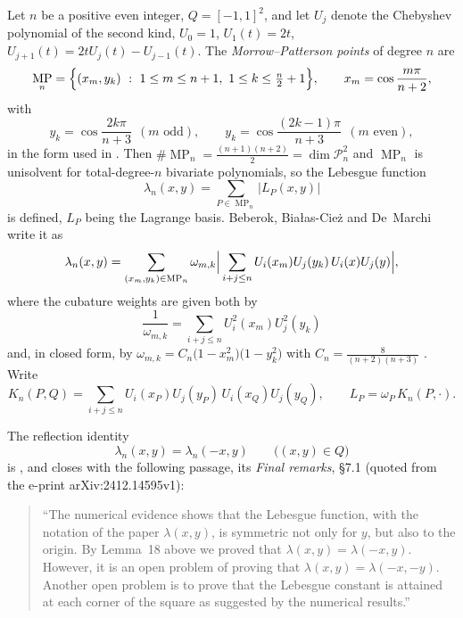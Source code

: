 \documentclass[11pt]{amsart}
\DeclareMathOperator{\MP}{MP}
\newcommand{\Q}{Q}
\begin{document}
Let $n$ be a positive even integer, $\Q=[-1,1]^2$, and let $U_j$ denote the
Chebyshev polynomial of the second kind, $U_0=1$, $U_1(t)=2t$,
$U_{j+1}(t)=2tU_j(t)-U_{j-1}(t)$. The \emph{Morrow--Patterson points}
\cite{MP} of degree $n$ are
\begin{equation}\label{eq:nodes}
  \MP_n=\Bigl\{(x_m,y_k)\ :\ 1\le m\le n+1,\ 1\le k\le \tfrac n2+1\Bigr\},
  \qquad
  x_m=\cos\frac{m\pi}{n+2},
\end{equation}
with
\[
  y_k=\cos\frac{2k\pi}{n+3}\ \ (m\text{ odd}),
  \qquad
  y_k=\cos\frac{(2k-1)\pi}{n+3}\ \ (m\text{ even}),
\]
in the form used in \cite[\S3.2]{BBD}. Then
$\#\MP_n=\frac{(n+1)(n+2)}2=\dim\mathcal P_n^2$ and $\MP_n$ is unisolvent
for total-degree-$n$ bivariate polynomials, so the Lebesgue function
\[
  \lambda_n(x,y)=\sum_{P\in\MP_n}\bigl|L_P(x,y)\bigr|
\]
is defined, $L_P$ being the Lagrange basis. Beberok, Bia\l as-Cie\.z and
De~Marchi \cite{BBD} write it as
\begin{equation}\label{eq:leb}
  \lambda_n(x,y)=\sum_{(x_m,y_k)\in\MP_n}\omega_{m,k}
  \Bigl|\,\sum_{i+j\le n}U_i(x_m)U_j(y_k)\,U_i(x)U_j(y)\Bigr|,
\end{equation}
where the cubature weights are given both by
\begin{equation}\label{eq:wdef}
  \frac1{\omega_{m,k}}=\sum_{i+j\le n}U_i^2(x_m)U_j^2(y_k)
\end{equation}
and, in closed form, by
$\omega_{m,k}=C_n\bigl(1-x_m^2\bigr)\bigl(1-y_k^2\bigr)$ with
$C_n=\frac{8}{(n+2)(n+3)}$ \cite[Thm.~2]{BBD}. Write
\begin{equation}\label{eq:kernel}
  K_n(P,Q)=\sum_{i+j\le n}U_i(x_P)U_j(y_P)\,U_i(x_Q)U_j(y_Q),
  \qquad L_P=\omega_P\,K_n(P,\cdot).
\end{equation}

The reflection identity
\begin{equation}\label{eq:lem15}
  \lambda_n(x,y)=\lambda_n(-x,y)\qquad\bigl((x,y)\in\Q\bigr)
\end{equation}
is \cite[Lemma~1]{BBD}, and \cite{BBD} closes with the following passage, its
\emph{Final remarks}, \S7.1 (quoted from the e-print arXiv:2412.14595v1):

\begin{quote}
``The numerical evidence shows that the Lebesgue function, with the notation of
the paper $\lambda(x,y)$, is symmetric not only for $y$, but also to the origin.
By Lemma~18 above we proved that $\lambda(x,y)=\lambda(-x,y)$. However, it is an
open problem of proving that $\lambda(x,y)=\lambda(-x,-y)$. Another open problem
is to prove that the Lebesgue constant is attained at each corner of the square
as suggested by the numerical results.''
\end{quote}
\end{document}
